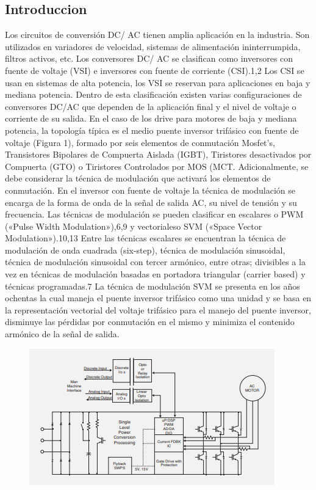 \documentclass[12pt,a4paper]{article}
\begin{document}
\subsection{Introduccion}
Los circuitos de conversión DC/
AC tienen amplia aplicación en la
industria. Son utilizados en variadores de velocidad, sistemas de alimentación ininterrumpida, filtros
activos, etc. Los conversores DC/
AC se clasifican como inversores
con fuente de voltaje (VSI) e inversores con fuente de corriente
(CSI).1,2 Los CSI se usan en sistemas de alta potencia, los VSI se reservan para aplicaciones en baja y
mediana potencia. Dentro de esta
clasificación existen varias configuraciones de conversores DC/AC que
dependen de la aplicación final y el
nivel de voltaje o corriente de su
salida. En el caso de los drive para
motores de baja y mediana potencia, la topología típica es el medio
puente inversor trifásico con fuente
de voltaje (Figura 1), formado por
seis elementos de conmutación
Mosfet’s, Transistores Bipolares de
Compuerta Aislada (IGBT), Tiristores desactivados por Compuerta
(GTO) o Tiristores Controlados por
MOS (MCT.
Adicionalmente, se debe considerar la técnica de modulación que activará los elementos de conmutación.
En el inversor con fuente de voltaje
la técnica de modulación se encarga
de la forma de onda de la señal de
salida AC, su nivel de tensión y su frecuencia. Las técnicas de modulación se pueden clasificar en escalares
o PWM («Pulse Width Modulation»),6,9 y vectorialeso SVM («Space Vector Modulation»).10,13 Entre las
técnicas escalares se encuentran la
técnica de modulación de onda cuadrada (six-step), técnica de modulación sinusoidal, técnica de modulación sinusoidal con tercer armónico,
entre otras; divisibles a la vez en técnicas de modulación basadas en portadora triangular (carrier based) y técnicas programadas.7
 La técnica de
modulación SVM se presenta en los
años ochentas la cual maneja el puente inversor trifásico como una unidad
y se basa en la representación vectorial del voltaje trifásico para el manejo del puente inversor, disminuye las
pérdidas por conmutación en el mismo y minimiza el contenido armónico de la señal de salida.
\begin{figure}[h!]
\centering
\includegraphics[scale=1]{Captura1.PNG} 
\end{figure}
\end{document}
